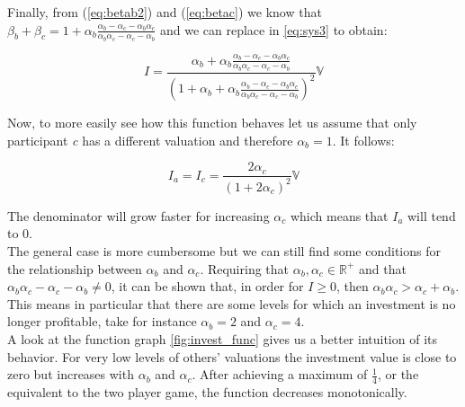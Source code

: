 Finally, from (\ref{eq:betab2}) and (\ref{eq:betac}) we know that $\beta_b+\beta_c = 1+\alpha_b\frac{\alpha_b-\alpha_c-\alpha_b\alpha_c}{\alpha_b\alpha_c-\alpha_c-\alpha_b}$ and we can replace in \ref{eq:sys3} to obtain:

\begin{equation}
\label{eq:InvDiffVal}
    I = \frac{\alpha_b+\alpha_b\frac{\alpha_b-\alpha_c-\alpha_b\alpha_c}{\alpha_b\alpha_c-\alpha_c-\alpha_b}}{(1+\alpha_b
    +\alpha_b\frac{\alpha_b-\alpha_c-\alpha_b\alpha_c}{\alpha_b\alpha_c-\alpha_c-\alpha_b})^2}\mathbb{V}
\end{equation}

\hfill \break

Now, to more easily see how this function behaves let us assume that only participant \textit{c} has a different valuation and therefore $\alpha_b = 1$. It follows:

\begin{equation}
    I_a=I_c=\frac{2\alpha_c}{(1+2\alpha_c)^2}\mathbb{V}
\end{equation}

The denominator will grow faster for increasing $\alpha_c$ which means that $I_a$ will tend to $0$.\\


The general case is more cumbersome but we can still find some conditions for the relationship between $\alpha_b$ and $\alpha_c$. Requiring that $\alpha_b, \alpha_c \in \mathbb{R}^+$ and that $\alpha_b\alpha_c-\alpha_c-\alpha_b \neq 0$, it can be shown that, in order for $I\geq0$, then $\alpha_b\alpha_c>\alpha_c+\alpha_b$.\\

This means in particular that there are some levels for which an investment is no longer profitable, take for instance $\alpha_b = 2$ and $\alpha_c = 4$.\\

A look at the function graph \ref{fig:invest_func} gives us a better intuition of its behavior. For very low levels of others' valuations the investment value is close to zero but increases with $\alpha_b$ and $\alpha_c$. After achieving a maximum of $\frac{1}{4}$, or the equivalent to the two player game, the function decreases monotonically.

